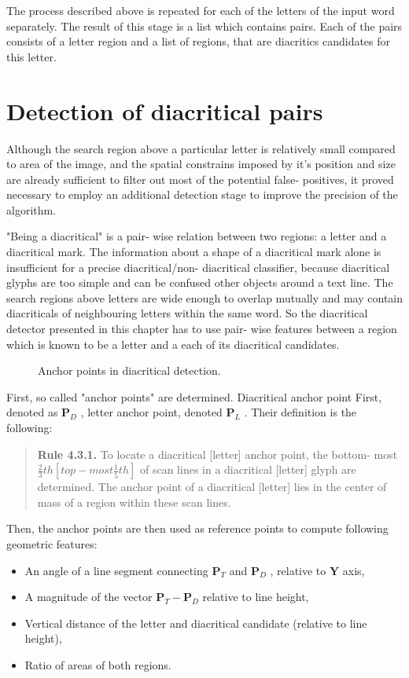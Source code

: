 \documentclass[12pt,a4paper]{report}
\begin{document}
The process described above is repeated for each of the letters of the input word separately. The result of this stage is a list which contains pairs. Each of the pairs consists of a letter region and a list of regions, that are diacritics candidates for this letter.

\section{Detection of diacritical pairs}
Although the search region above a particular letter is relatively small compared to area of the image, and the spatial constrains imposed by it's position and size are already sufficient to filter out most of the potential false- positives, it proved necessary to employ an additional detection stage to improve the precision of the algorithm.

"Being a diacritical" is a pair- wise relation between two regions: a letter and a diacritical mark. The information about a shape of a diacritical mark alone is insufficient for a precise diacritical/non- diacritical classifier, because diacritical glyphs are too simple and can be confused other objects around a text line. The search regions above letters are wide enough to overlap mutually and may contain diacriticals of neighbouring letters within the same word. So the diacritical detector presented in this chapter has to use pair- wise features between a region which is known to be a letter and a each of its diacritical candidates.

\begin{figure}[htbp]
    \centering
    \caption{Anchor points in diacritical detection.}
    \label{fig:anchor-points}
\end{figure}

First, so called "anchor points" are determined. Diacritical anchor point First, denoted as $\mathbf{P}_D$ , letter anchor point, denoted $\mathbf{P}_L$ . Their definition is the following:
\begin{quote}
\textbf{Rule 4.3.1.} To locate a diacritical [letter] anchor point, the bottom- most $\frac{2}{3} th\left[top - most\frac{1}{5} th\right]$ of scan lines in a diacritical [letter] glyph are determined. The anchor point of a diacritical [letter] lies in the center of mass of a region within these scan lines.
\end{quote}

Then, the anchor points are then used as reference points to compute following geometric features:
\begin{itemize}
    \item An angle of a line segment connecting $\mathbf{P}_T$ and $\mathbf{P}_D$ , relative to $\mathbf{Y}$ axis,
    \item A magnitude of the vector $\mathbf{P}_T - \mathbf{P}_D$ relative to line height,
    \item Vertical distance of the letter and diacritical candidate (relative to line height),
    \item Ratio of areas of both regions.
\end{itemize}
\end{document}
